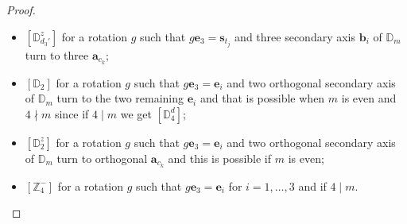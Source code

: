 \documentclass[11pt,a4paper]{amsart}
\theoremstyle{definition}
\newcommand{\ZZ}{\mathbb{Z}}                %
\newcommand{\SO}{\mathrm{SO}}               %
\newcommand{\tetra}{\mathbb{T}}             %
\newcommand{\DD}{\mathbb{D}}                %
\newcommand{\1}{\mathds{1}}		            %
\newcommand{\ee}{\pmb{e}}                   %
\newcommand{\uu}{\pmb{u}}                   %
\newcommand{\vv}{\pmb{v}}                   %
\newcommand{\bs}{\mathbf{s}}
\newcommand{\bb}{\mathbf{b}}
\begin{document}
\begin{proof}
\begin{itemize}
		\item $[\DD_{d_3'}^z]$ for a rotation $g$ such that $g\ee_3=\pmb{s}_{t_j}$ and three secondary axis $\bb_i$ of $\DD_m$ turn to three $\pmb{a}_{c_k}$;
		\item $[\DD_2]$ for a rotation $g$ such that $g\ee_3=\ee_i$ and two orthogonal secondary axis of $\DD_m$ turn to the two remaining $\ee_i$ and that is possible when $m$ is even and $4\nmid m$ since if $4\mid m$ we get $[\DD_4^d]$;
		\item $[\DD_2^z]$ for a rotation $g$ such that $g\ee_3=\ee_i$ and two orthogonal secondary axis of $\DD_m$ turn to orthogonal $\pmb{a}_{c_k}$ and this is possible if $m$ is even;
		\item $[\ZZ_4^-]$ for a rotation $g$ such that $g\ee_3=\ee_i$ for $i=1,\dotsc,3$ and if $4\mid m$.
	
	\end{itemize}
\end{proof}

\end{document}
